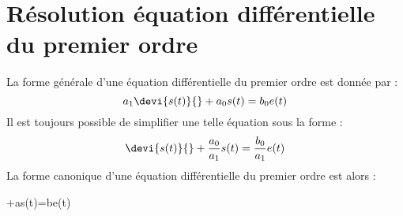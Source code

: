 \section{Résolution équation différentielle du premier ordre}
La forme générale d'une équation différentielle du premier ordre est
donnée par : 
\[
a_1\devi{s(t)}{}+a_0s(t)=b_0e(t)
\]
Il est toujours possible de simplifier une telle équation sous la forme :
\[
\devi{s(t)}{}+\dfrac{a_0}{a_1}s(t)=\dfrac{b_0}{a_1}e(t)
\]
La forme canonique d'une équation différentielle du premier ordre est alors :
\begin{bequation}
+as(t)=be(t)
\end{bequation}
